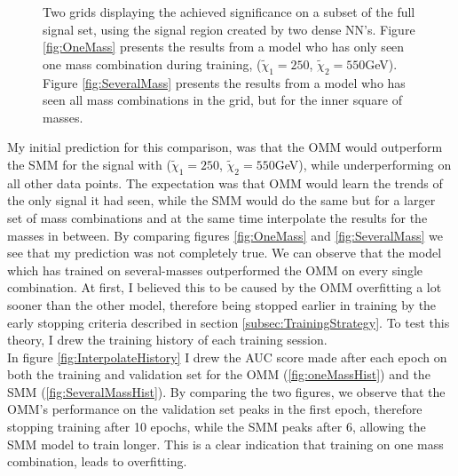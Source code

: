 \begin{figure}
{\begin{subfigure}{.6\textwidth}
    \end{subfigure}
    }
    \caption[Two grids displaying the achieved significance on a subset of the full signal set, using the signal region 
    created by two dense \acs{NN}'s, each training on different amounts of signal.]{Two grids displaying the achieved significance 
    on a subset of the full signal set, using the signal region created by two dense \ac{NN}'s. Figure \ref{fig:OneMass} presents the results 
    from a model who has only seen one mass combination during training, ($\tilde{\chi}_1=250$, $\tilde{\chi}_2=550$GeV). Figure 
    \ref{fig:SeveralMass} presents the results from a model who has seen all mass combinations in the grid, but for the inner square of masses. }
    \label{fig:Interpolation}
\end{figure}
My initial prediction for this comparison, was that the \ac{OMM} would outperform the \ac{SMM} for the signal with
($\tilde{\chi}_1=250$, $\tilde{\chi}_2=550$GeV), while underperforming on all other data points. The expectation was that \ac{OMM} 
would learn the trends of the only signal it had seen, while the \ac{SMM} would do the same but for a larger set of mass combinations and 
at the same time interpolate the results for the masses in between. By comparing figures \ref{fig:OneMass} and \ref{fig:SeveralMass} we 
see that my prediction was not completely true. We can observe that the model which has trained on several-masses outperformed the 
\ac{OMM} on every single combination. At first, I believed this to be caused by the \ac{OMM} overfitting a lot sooner than the other 
model, therefore being stopped earlier in training by the early stopping criteria described in section \ref{subsec:TrainingStrategy}. 
To test this theory, I drew the training history of each training session.
\\
In figure \ref{fig:InterpolateHistory} I drew the \ac{AUC} score made after each epoch on both the training and validation set
for the \ac{OMM} (\ref{fig:oneMassHist}) and the \ac{SMM} (\ref{fig:SeveralMassHist}). By comparing the two figures,
we observe that the \ac{OMM}'s performance on the validation set peaks in the first epoch, therefore stopping training after 
10 epochs, while the \ac{SMM} peaks after 6, allowing the \ac{SMM} model to train longer. This is a clear indication that training on one mass combination, leads 
to overfitting. 
